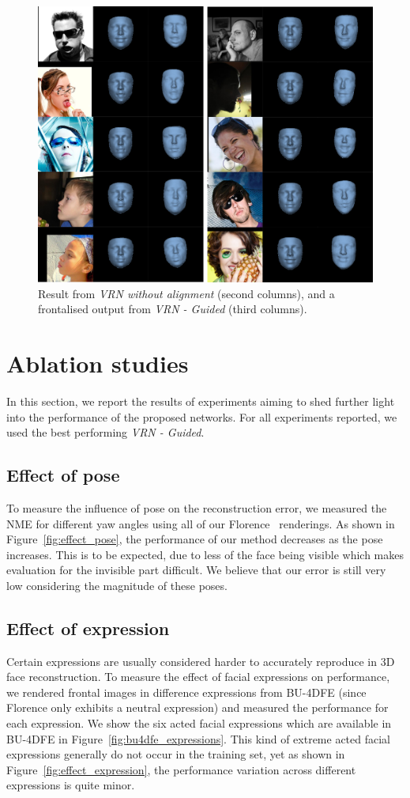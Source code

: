 \begin{figure}
  \centering
  \includegraphics[width=0.7\linewidth]{img/frontal.png}
  \caption[Visual results when spatial alignment is ignored]{Result from
    \textit{VRN without alignment} (second columns), and a frontalised
    output from \textit{VRN - Guided} (third columns).}
  \label{fig:frontal_visual}
\end{figure}

\section{Ablation studies}
\label{chapter:face:sec:ablation}

In this section, we report the results of experiments aiming to shed
further light into the performance of the proposed networks. For all
experiments reported, we used the best performing \textit{VRN -
  Guided}.

\subsection{Effect of pose}
To measure the influence of pose on the reconstruction error, we
measured the NME for different yaw angles using all of our
Florence~\cite{masi2d3dFaceData} renderings. As shown in
Figure~\ref{fig:effect_pose}, the performance of our method decreases as
the pose increases. This is to be expected, due to less of the face
being visible which makes evaluation for the invisible part
difficult. We believe that our error is still very low considering
the magnitude of these poses.


\subsection{Effect of expression} Certain expressions are usually
considered harder to accurately reproduce in 3D face reconstruction.
To measure the effect of facial expressions on performance, we
rendered frontal images in difference expressions from BU-4DFE (since
Florence only exhibits a neutral expression) and measured the
performance for each expression. We show the six acted facial
expressions which are available in BU-4DFE in
Figure~\ref{fig:bu4dfe_expressions}. This kind of extreme acted facial
expressions generally do not occur in the training set, yet as shown
in Figure~\ref{fig:effect_expression}, the performance variation
across different expressions is quite minor.

